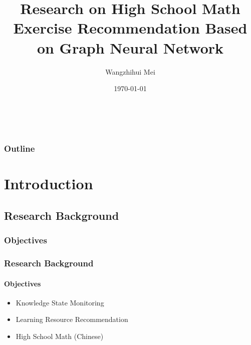 \documentclass{beamer}
\title[Exercise Recommendation]{Research on High School Math Exercise Recommendation Based on Graph Neural Network} %
\author{Wangzhihui Mei} %
\institute[UOW] 
{
University of Wollongong \\ %
\medskip
\textit{maywzh@gmail.com} %
}
\date{\today} %
\begin{document}
\begin{frame}
  \titlepage\ %
\end{frame}

\begin{frame}
  \frametitle{Outline} %
  \tableofcontents %
\end{frame}


\section{Introduction}
\subsection{Research Background}
\subsubsection{Objectives}
\begin{frame}
  \frametitle{Research Background}
  \framesubtitle{Objectives}
  \begin{itemize}
    \item Knowledge State Monitoring
    \item Learning Resource Recommendation
    \item High School Math (Chinese)
  \end{itemize}
\end{frame}

\end{document}
